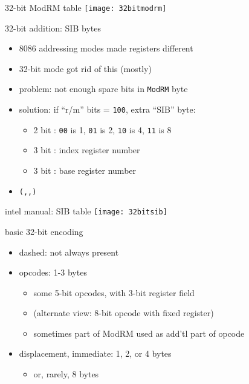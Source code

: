 \begin{frame}{32-bit ModRM table}
\texttt{[image: 32bitmodrm]}
\end{frame}

\begin{frame}{32-bit addition: SIB bytes}
\begin{itemize}
\item 8086 addressing modes made registers different
\item 32-bit mode got rid of this (mostly)
\item problem: not enough spare bits in {\tt ModRM} byte
\item solution: if ``r/m'' bits = {\tt 100}, extra ``SIB'' byte:
    \begin{itemize}
    \item 2 bit : {\tt 00} is 1, {\tt 01} is 2, {\tt 10} is 4, {\tt 11} is 8
    \item 3 bit : index register number
    \item 3 bit : base register number
    \end{itemize}
\item {\tt (,,)}
\end{itemize}
\end{frame}

\begin{frame}{intel manual: SIB table}
\texttt{[image: 32bitsib]}
\end{frame}

\begin{frame}{basic 32-bit encoding}
\begin{itemize}
\item dashed: not always present
\item opcodes: 1-3 bytes
    \begin{itemize}
    \item some 5-bit opcodes, with 3-bit register field
    \item (alternate view: 8-bit opcode with fixed register)
    \item sometimes part of ModRM used as add'tl part of opcode
    \end{itemize}
\item displacement, immediate: 1, 2, or 4 bytes
    \begin{itemize}
    \item or, rarely, 8 bytes
    \end{itemize}
\end{itemize}
\end{frame}

